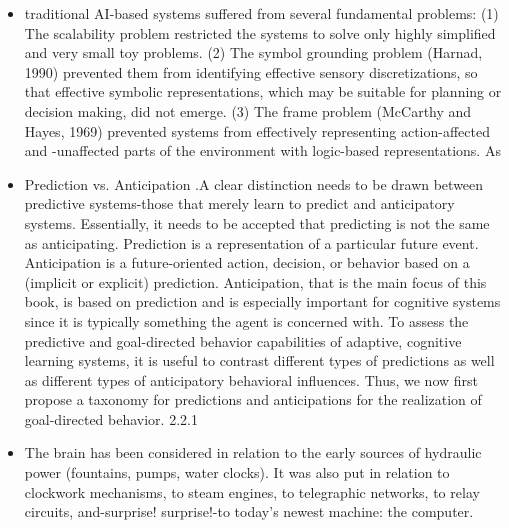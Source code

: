 \documentclass[]{usiinfdocprop}
\begin{document}
\begin{itemize}
    \item \citep[Chapter 1.2.1]{Pezzulo2014} traditional AI-based systems suffered from several fundamental problems: (1) The scalability problem restricted the systems to solve only highly simplified and very small toy problems. (2) The symbol grounding problem (Harnad, 1990) prevented them from identifying effective sensory discretizations, so that effective symbolic representations, which may be suitable for planning or decision making, did not emerge. (3) The frame problem (McCarthy and Hayes, 1969) prevented systems from effectively representing action-affected and -unaffected parts of the environment with logic-based representations. As
    
   \item \citep[Chapter~2.2]{Pezzulo2014} Prediction vs. Anticipation  .A clear distinction needs to be drawn between predictive systems-those that merely learn to predict and anticipatory systems. Essentially, it needs to be accepted that predicting is not the same as anticipating. Prediction is a representation of a particular future event. Anticipation is a future-oriented action, decision, or behavior based on a (implicit or explicit) prediction. Anticipation, that is the main focus of this book, is based on prediction and is especially important for cognitive systems since it is typically something the agent is concerned with. To assess the predictive and goal-directed behavior capabilities of adaptive, cognitive learning systems, it is useful to contrast different types of predictions as well as different types of anticipatory behavioral influences. Thus, we now first propose a taxonomy for predictions and anticipations for the realization of goal-directed behavior. 2.2.1
   
   \item \citep{Nadin2016} The brain has been considered in relation to the early sources of hydraulic power (fountains, pumps, water clocks). It was also put in relation to clockwork mechanisms, to steam engines, to telegraphic networks, to relay circuits, and-surprise! surprise!-to today's newest machine: the computer.
   

\end{itemize}
\end{document}
